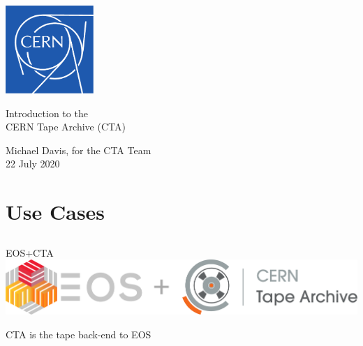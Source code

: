 \documentclass{beamer}
\begin{document}

{
\begin{frame}
\begin{center}
\vspace{-4ex}
\includegraphics[width=0.25\textwidth]{../Logo/cern-logo-blue}\\[4ex]
\color{cern@dkblue}
\begin{spacing}{1.0}
   {\fontsize{17}{22}Introduction to the}\\[2ex]
   {\fontsize{17}{22}CERN Tape Archive (CTA)}\\[4ex]
\end{spacing}
\color{cern@dkcomp}
   {\large Michael Davis, for the CTA Team}\\[2ex]
   {22 July 2020}
\end{center}
\end{frame}
}

\color{cern@dkblue}


\section{Use Cases}
\subsection{}

\begin{frame}{EOS+CTA}{}
   \centering
   \includegraphics[width=\textwidth]{images/EOS+CTA_Logo}

   \vspace{1cm}
   {\LARGE\centering CTA is the tape back-end to EOS}
\end{frame}
\end{document}
